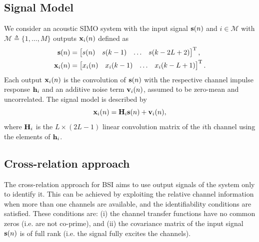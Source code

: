 \documentclass{article}
\newcommand{\h}{\mtxb{h}}
\newcommand{\x}{\mtxb{x}}
\newcommand{\Mset}{\mathcal{M}}
\begin{document}
\subsection{Signal Model}
\label{ssec:signal_model}
We consider an acoustic SIMO system with the input signal \(\bm{\mathrm{s}}(n)\) and \(i \in \Mset\) with \(\Mset \triangleq \{1,\ldots,M\} \) outputs \(\x_i(n)\) defined as
\begin{align}
    \mtxb{s}(n) &= \begin{bmatrix}
        s(n)&s(k-1)&\ldots&s(k-2L+2)
    \end{bmatrix}^{\T},\\
    \x_i(n) &= \begin{bmatrix}
        x_i(n)&x_i(k-1)&\ldots&x_i(k-L+1)
    \end{bmatrix}^{\T}.
\end{align}
Each output \(\x_i(n)\) is the convolution of \(\bm{\mathrm{s}}(n)\) with the respective channel impulse response \(\h_i\) and an additive noise term \(\bm{\mathrm{v}}_i(n)\), assumed to be zero-mean and uncorrelated.
The signal model is described by
\begin{equation}
    \x_i(n) = \mtxb{H}_i \mtxb{s}(n) + \mtxb{v}_i(n),
\end{equation}
where \(\bm{\mathrm{H}}_i\) is the \(L \times (2L-1)\) linear convolution matrix of the \(i\)th channel using the elements of \(\h_i\).

\subsection{Cross-relation approach}
\label{ssec:cross_rel}
The cross-relation approach for BSI aims to use output signals of the system only to identify it.
This can be achieved by exploiting the relative channel information when more than one channels are available, and the identifiability conditions \cite{guanghanxuLeastsquaresApproachBlind1995} are satisfied. These conditions are: (i) the channel transfer functions have no common zeros (i.e. are not co-prime), and (ii) the covariance matrix of the input signal \(\bm{\mathrm{s}}(n)\) is of full rank (i.e. the signal fully excites the channels).
\end{document}
